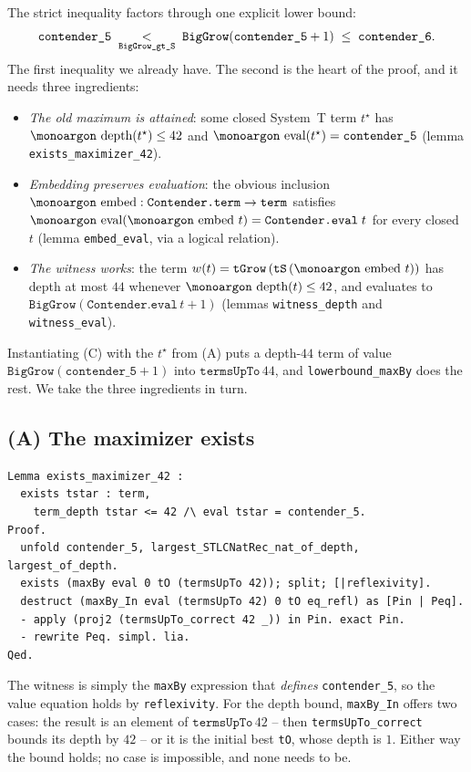 \documentclass[11pt,a4paper]{article}
\theoremstyle{plain}
\theoremstyle{definition}
\theoremstyle{remark}
\newcommand{\opname}[1]{\mathop{\text{\monoargon #1}}\nolimits}
\newcommand{\depth}{\opname{depth}}
\newcommand{\eval}{\opname{eval}}
\newcommand{\embed}{\opname{embed}}
\begin{document}
The strict inequality factors through one explicit lower bound:
\[
  \texttt{contender\_5}
  \;\underset{\text{\texttt{BigGrow\_gt\_S}}}{<}\;
  \texttt{BigGrow}(\texttt{contender\_5}+1)
  \;\leq\;
  \texttt{contender\_6}.
\]
The first inequality we already have.  The second is the heart of the
proof, and it needs three ingredients:

\begin{itemize}[leftmargin=2em]
  \item[\textbf{(A)}] \emph{The old maximum is attained}: some closed
    System~T term $t^\star$ has $\depth(t^\star) \leq 42$ and
    $\eval(t^\star) = \texttt{contender\_5}$
    (lemma \texttt{exists\_maximizer\_42}).
  \item[\textbf{(B)}] \emph{Embedding preserves evaluation}: the
    obvious inclusion
    $\embed : \texttt{Contender.term} \to \texttt{term}$ satisfies
    $\eval(\embed\,t) = \texttt{Contender.eval}\;t$ for every closed
    $t$ (lemma \texttt{embed\_eval}, via a logical relation).
  \item[\textbf{(C)}] \emph{The witness works}: the term
    $w(t) = \texttt{tGrow}\,(\texttt{tS}\,(\embed\,t))$ has depth at
    most $44$ whenever $\depth(t) \leq 42$, and evaluates to
    $\texttt{BigGrow}(\texttt{Contender.eval}\,t + 1)$
    (lemmas \texttt{witness\_depth} and \texttt{witness\_eval}).
\end{itemize}

Instantiating (C) with the $t^\star$ from (A) puts a depth-$44$ term
of value $\texttt{BigGrow}(\texttt{contender\_5}+1)$ into
$\texttt{termsUpTo}\,44$, and \texttt{lowerbound\_maxBy} does the
rest.  We take the three ingredients in turn.

\subsection{(A) The maximizer exists}

\begin{lstlisting}
Lemma exists_maximizer_42 :
  exists tstar : term,
    term_depth tstar <= 42 /\ eval tstar = contender_5.
Proof.
  unfold contender_5, largest_STLCNatRec_nat_of_depth, largest_of_depth.
  exists (maxBy eval 0 tO (termsUpTo 42)); split; [|reflexivity].
  destruct (maxBy_In eval (termsUpTo 42) 0 tO eq_refl) as [Pin | Peq].
  - apply (proj2 (termsUpTo_correct 42 _)) in Pin. exact Pin.
  - rewrite Peq. simpl. lia.
Qed.
\end{lstlisting}

The witness is simply the \texttt{maxBy} expression that
\emph{defines} \texttt{contender\_5}, so the value equation holds by
\texttt{reflexivity}.  For the depth bound, \texttt{maxBy\_In} offers
two cases: the result is an element of $\texttt{termsUpTo}\,42$ --
then \texttt{termsUpTo\_correct} bounds its depth by $42$ -- or it is
the initial best \texttt{tO}, whose depth is $1$.  Either way the
bound holds; no case is impossible, and none needs to be.
\end{document}
